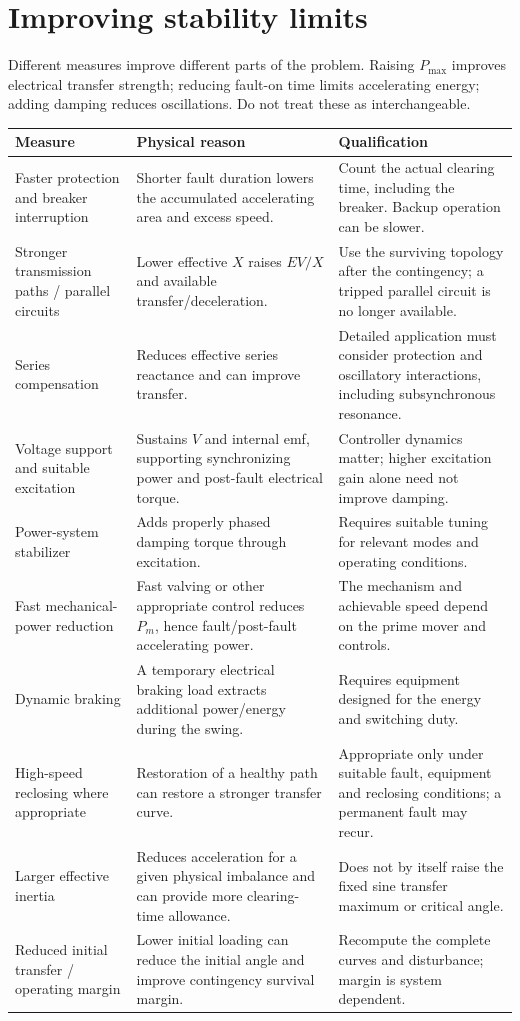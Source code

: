\documentclass[11pt,a4paper]{article}
\newcommand{\chapterstart}[2]{\par\needspace{12\baselineskip}\section{#1}\label{#2}}
\begin{document}
\chapterstart{Improving stability limits}{improvements}
Different measures improve different parts of the problem. Raising $P_{\max}$ improves electrical transfer strength; reducing fault-on time limits accelerating energy; adding damping reduces oscillations. Do not treat these as interchangeable.
\begin{center}\small\begin{longtable}{L{.23\textwidth}L{.40\textwidth}L{.28\textwidth}}
\toprule Measure & Physical reason & Qualification\\\midrule\endhead
Faster protection and breaker interruption & Shorter fault duration lowers the accumulated accelerating area and excess speed. & Count the actual clearing time, including the breaker. Backup operation can be slower.\\
Stronger transmission paths / parallel circuits & Lower effective $X$ raises $EV/X$ and available transfer/deceleration. & Use the surviving topology after the contingency; a tripped parallel circuit is no longer available.\\
Series compensation & Reduces effective series reactance and can improve transfer. & Detailed application must consider protection and oscillatory interactions, including subsynchronous resonance.\\
Voltage support and suitable excitation & Sustains $V$ and internal emf, supporting synchronizing power and post-fault electrical torque. & Controller dynamics matter; higher excitation gain alone need not improve damping.\\
Power-system stabilizer & Adds properly phased damping torque through excitation. & Requires suitable tuning for relevant modes and operating conditions.\\
Fast mechanical-power reduction & Fast valving or other appropriate control reduces $P_m$, hence fault/post-fault accelerating power. & The mechanism and achievable speed depend on the prime mover and controls.\\
Dynamic braking & A temporary electrical braking load extracts additional power/energy during the swing. & Requires equipment designed for the energy and switching duty.\\
High-speed reclosing where appropriate & Restoration of a healthy path can restore a stronger transfer curve. & Appropriate only under suitable fault, equipment and reclosing conditions; a permanent fault may recur.\\
Larger effective inertia & Reduces acceleration for a given physical imbalance and can provide more clearing-time allowance. & Does not by itself raise the fixed sine transfer maximum or critical angle.\\
Reduced initial transfer / operating margin & Lower initial loading can reduce the initial angle and improve contingency survival margin. & Recompute the complete curves and disturbance; margin is system dependent.\\\bottomrule
\end{longtable}\end{center}
\end{document}
